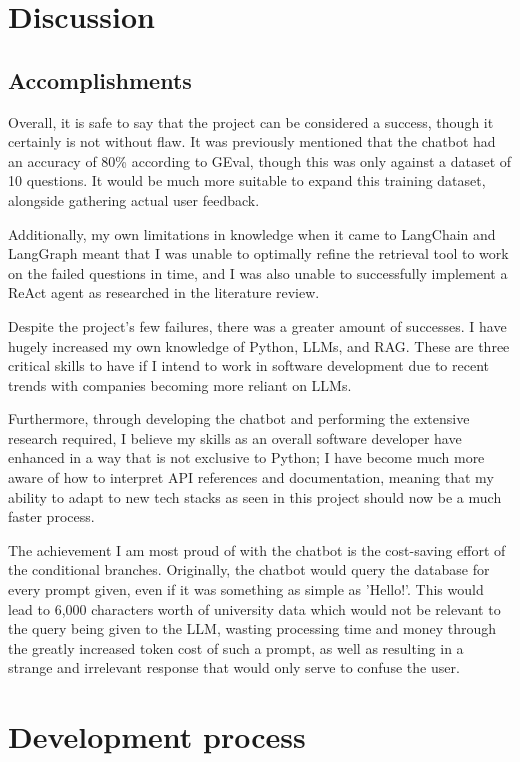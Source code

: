 \section{Discussion}

\subsection{Accomplishments}
Overall, it is safe to say that the project can be considered a success, though it certainly is not without flaw.
It was previously mentioned that the chatbot had an accuracy of 80\% according to GEval, though this was only against a dataset 
of 10 questions. It would be much more suitable to expand this training dataset, alongside gathering actual user feedback.

\para Additionally, my own limitations in knowledge when it came to LangChain and LangGraph meant that I was unable to optimally refine the 
retrieval tool to work on the failed questions in time, and I was also unable to successfully implement a ReAct agent as researched in the 
literature review.

\para Despite the project's few failures, there was a greater amount of successes. I have hugely increased my own knowledge of Python, LLMs,
and RAG. These are three critical skills to have if I intend to work in software development due to recent trends with companies 
becoming more reliant on LLMs. 

\para Furthermore, through developing the chatbot and performing the extensive research required, I believe my skills as an overall software 
developer have enhanced in a way that is not exclusive to Python; I have become much more aware of how to interpret API references and documentation,
meaning that my ability to adapt to new tech stacks as seen in this project should now be a much faster process.

\para The achievement I am most proud of with the chatbot is the cost-saving effort of the conditional branches. Originally, the chatbot would 
query the database for every prompt given, even if it was something as simple as 'Hello!'. This would lead to 6,000 characters worth of university
data which would not be relevant to the query being given to the LLM, wasting processing time and money through the greatly increased token cost 
of such a prompt, as well as resulting in a strange and irrelevant response that would only serve to confuse the user. 

\section{Development process}\label{sec:EvalProcess}
